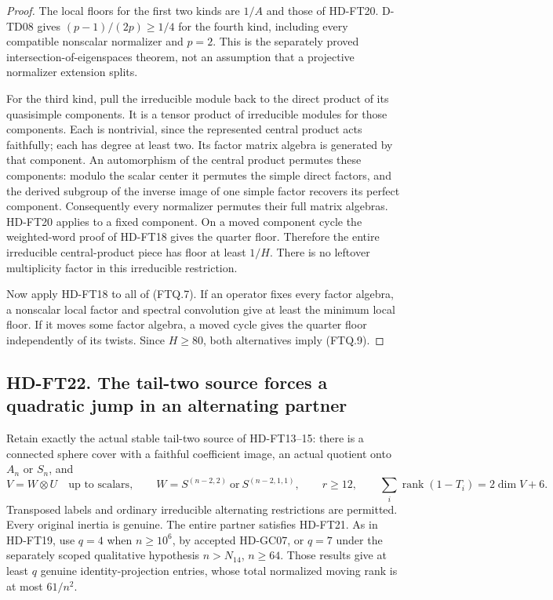 \begin{proof}
The local floors for the first two kinds are \(1/A\) and those
of HD-FT20.  D-TD08 gives \((p-1)/(2p)\ge1/4\) for the fourth
kind, including every compatible nonscalar normalizer and \(p=2\).
This is the separately proved intersection-of-eigenspaces theorem,
not an assumption that a projective normalizer extension splits.

For the third kind, pull the irreducible module back to the direct
product of its quasisimple components.  It is a tensor product
of irreducible modules for those components.  Each is nontrivial,
since the represented central product acts faithfully; each has
degree at least two.  Its factor matrix algebra is generated by
that component.  An automorphism of the central product permutes
these components: modulo the scalar center it permutes the simple
direct factors, and the derived subgroup of the inverse image of
one simple factor recovers its perfect component.  Consequently
every normalizer permutes their full matrix algebras.  HD-FT20
applies to a fixed component.  On a moved component cycle the
weighted-word proof of HD-FT18 gives the quarter floor.  Therefore
the entire irreducible central-product piece has floor at least
\(1/H\).  There is no leftover multiplicity factor in this
irreducible restriction.

Now apply HD-FT18 to all of (FTQ.7).  If an operator fixes every
factor algebra, a nonscalar local factor and spectral convolution
give at least the minimum local floor.  If it moves some factor
algebra, a moved cycle gives the quarter floor independently of
its twists.  Since \(H\ge80\), both alternatives imply (FTQ.9).
\end{proof}

\subsection*{HD-FT22. The tail-two source forces a quadratic jump in an alternating partner}

Retain exactly the actual stable tail-two source of HD-FT13--15:
there is a connected sphere cover with a faithful coefficient image,
an actual quotient onto \(A_n\) or \(S_n\), and
\[
 V=W\otimes U\quad\text{up to scalars},\qquad
 W=S^{(n-2,2)}\ \text{or}\ S^{(n-2,1,1)},\qquad
 r\ge12,\qquad
 \sum_i\operatorname{rank}(1-T_i)=2\dim V+6.
 \tag{FTQ.10}
\]
Transposed labels and ordinary irreducible alternating restrictions
are permitted.  Every original inertia is genuine.  The entire
partner satisfies HD-FT21.  As in HD-FT19, use \(q=4\) when
\(n\ge10^6\), by accepted HD-GC07, or \(q=7\) under the separately
scoped qualitative hypothesis \(n>N_{14}\), \(n\ge64\).
Those results give at least \(q\) genuine identity-projection
entries, whose total normalized moving rank is at most \(61/n^2\).

